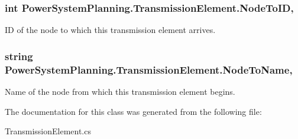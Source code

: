 \subsubsection[{\texorpdfstring{Node\+To\+ID}{NodeToID}}]{\setlength{\rightskip}{0pt plus 5cm}int Power\+System\+Planning.\+Transmission\+Element.\+Node\+To\+ID\hspace{0.3cm}{\ttfamily [get]}, {\ttfamily [set]}}\hypertarget{class_power_system_planning_1_1_transmission_element_a670796e35f8f4af35326cfc1dd1b104f}{}\label{class_power_system_planning_1_1_transmission_element_a670796e35f8f4af35326cfc1dd1b104f}


ID of the node to which this transmission element arrives. 

\subsubsection[{\texorpdfstring{Node\+To\+Name}{NodeToName}}]{\setlength{\rightskip}{0pt plus 5cm}string Power\+System\+Planning.\+Transmission\+Element.\+Node\+To\+Name\hspace{0.3cm}{\ttfamily [get]}, {\ttfamily [set]}}\hypertarget{class_power_system_planning_1_1_transmission_element_ad6028ae3c8e7ac1527cfde854c81dedd}{}\label{class_power_system_planning_1_1_transmission_element_ad6028ae3c8e7ac1527cfde854c81dedd}


Name of the node from which this transmission element begins. 



The documentation for this class was generated from the following file\+:\begin{DoxyCompactItemize}
\item 
Transmission\+Element.\+cs\end{DoxyCompactItemize}
